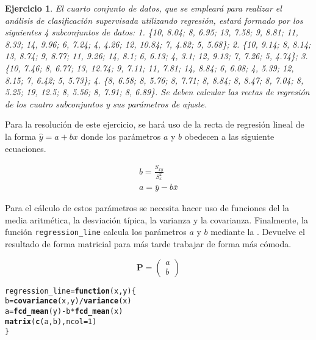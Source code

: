 \documentclass[12pt]{report}\usepackage[]{graphicx}\usepackage[dvipsnames]{xcolor}
\makeatletter
\newcommand{\hlnum}[1]{\textcolor[rgb]{0.686,0.059,0.569}{#1}}%
\newcommand{\hlopt}[1]{\textcolor[rgb]{0,0,0}{#1}}%
\newcommand{\hlstd}[1]{\textcolor[rgb]{0.345,0.345,0.345}{#1}}%
\newcommand{\hlkwa}[1]{\textcolor[rgb]{0.161,0.373,0.58}{\textbf{#1}}}%
\newcommand{\hlkwb}[1]{\textcolor[rgb]{0.69,0.353,0.396}{#1}}%
\newcommand{\hlkwc}[1]{\textcolor[rgb]{0.333,0.667,0.333}{#1}}%
\newcommand{\hlkwd}[1]{\textcolor[rgb]{0.737,0.353,0.396}{\textbf{#1}}}%
\newenvironment{kframe}{%
 \def\at@end@of@kframe{}%
 \ifinner\ifhmode%
  \def\at@end@of@kframe{\end{minipage}}%
  \begin{minipage}{\columnwidth}%
 \fi\fi%
 \def\FrameCommand##1{\hskip\@totalleftmargin \hskip-\fboxsep
 \colorbox{shadecolor}{##1}\hskip-\fboxsep
     \hskip-\linewidth \hskip-\@totalleftmargin \hskip\columnwidth}%
 \MakeFramed {\advance\hsize-\width
   \@totalleftmargin\z@ \linewidth\hsize
   \@setminipage}}%
 {\par\unskip\endMakeFramed%
 \at@end@of@kframe}
\newenvironment{knitrout}{}{} %
\newtheorem{exercise}{Ejercicio}[section]
\makeatother
\begin{document}
 				\begin{exercise}
 					El cuarto conjunto de datos, que se empleará para realizar el análisis de clasificación supervisada utilizando regresión, estará formado por los siguientes 4 subconjuntos de datos: 1. \{10, 8.04; 8, 6.95; 13, 7.58; 9, 8.81; 11, 8.33; 14, 9.96; 6, 7.24; 4, 4.26; 12, 10.84; 7, 4.82; 5, 5.68\}; 2. \{10, 9.14; 8, 8.14; 13, 8.74; 9, 8.77; 11, 9.26; 14, 8.1; 6, 6.13; 4, 3.1; 12, 9.13; 7, 7.26; 5, 4.74\}; 3. \{10, 7.46; 8, 6.77; 13, 12.74; 9, 7.11; 11, 7.81; 14, 8.84; 6, 6.08; 4, 5.39; 12, 8.15; 7, 6.42; 5, 5.73\}; 4. \{8, 6.58; 8, 5.76; 8, 7.71; 8, 8.84; 8, 8.47; 8, 7.04; 8, 5.25; 19, 12.5; 8, 5.56; 8, 7.91; 8, 6.89\}. Se deben calcular las rectas de regresión de los cuatro subconjuntos y sus parámetros de ajuste.
 				\end{exercise}
 				
 				Para la resolución de este ejercicio, se hará uso de la recta de regresión lineal de la forma $\hat{y} = a + bx$ donde los parámetros $a$ y $b$ obedecen a las siguiente ecuaciones. 
 				
 				\begin{equation}\label{ec:reg_param}
 					\begin{gathered}
 						b = \frac{S_{xy}}{S^2_x}\\
 						a = \bar{y} - b \bar{x}
 					\end{gathered}
 				\end{equation}
 				
 				Para el cálculo de estos parámetros se necesita hacer uso de funciones del  la media aritmética, la desviación típica, la varianza y la covarianza. Finalmente, la función \texttt{regression\_line} calcula los parámetros $a$ y $b$ mediante la . Devuelve el resultado de forma matricial para más tarde trabajar de forma más cómoda. 
 				
 				$$
 				\textbf{P} = \begin{pmatrix}
 					a\\
 					b
 				\end{pmatrix}
 				$$
 				
\begin{knitrout}
\color{fgcolor}\begin{kframe}
\begin{alltt}
\hlstd{regression_line} \hlkwb{=} \hlkwa{function}\hlstd{(}\hlkwc{x}\hlstd{,} \hlkwc{y}\hlstd{) \{}
        \hlstd{b} \hlkwb{=} \hlkwd{covariance}\hlstd{(x, y)} \hlopt{/} \hlkwd{variance}\hlstd{(x)}
        \hlstd{a} \hlkwb{=} \hlkwd{fcd_mean}\hlstd{(y)} \hlopt{-} \hlstd{b} \hlopt{*} \hlkwd{fcd_mean}\hlstd{(x)}
        \hlkwd{matrix}\hlstd{(}\hlkwd{c}\hlstd{(a, b),} \hlkwc{ncol} \hlstd{=} \hlnum{1}\hlstd{)}
\hlstd{\}}
\end{alltt}
\end{kframe}
\end{knitrout}
 				
\end{document}
